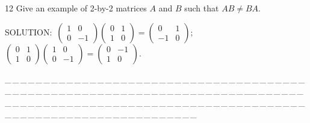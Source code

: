 \documentclass[a4paper, 11pt, UTF8]{article}
\begin{document}
\begin{large}
{\timesbf\Large 12} {\timessl\Large 
Give an example of 2-by-2 matrices $A$ and $B$ such that $AB\neq BA$.
}\par
{\timesbf S\footnotesize{OLUTION:}}\,\,\,$\begin{pmatrix} 1 & 0\\ 0 & -1\end{pmatrix}\begin{pmatrix}
0 & 1\\ 1 & 0\end{pmatrix}=\begin{pmatrix} 0 & 1\\ -1 & 0\end{pmatrix};$\qquad
$\begin{pmatrix} 0 & 1\\ 1 & 0\end{pmatrix}\begin{pmatrix}
1 & 0\\ 0 & -1\end{pmatrix}=\begin{pmatrix} 0 & -1\\ 1 & 0\end{pmatrix}.$\par
{\tiny \_\,\_\,\_\,\_\,\_\,\_\,\_\,\_\,\_\,\_\,\_\,\_\,\_\,\_\,\_\,\_\,\_\,\_\,\_\,\_\,\_\,\_\,\_\,\_\,\_\,\_\,\_\,\_\,\_\,\_\,\_\,\_\,\_\,\_\,\_\,\_\,\_\,\_\,\_\,\_\,\_\,\_\,\_\,\_\,\_\,\_\,\_\,\_\,\_\,\_\,\_\,\_\,\_\,\_\,\_\,\_\,\_\,\_\,\_\,\_\,\_\,\_\,\_\,\_\,\_\,\_\,\_\,\_\,\_\,\_\,\_\_\,\_\,\_\,\_\,\_\,\_\,\_\,\_\,\_\,\_\,\_\,\_\,\_\,\_\,\_\,\_\,\_\,\_\,\_\,\_\,\_\,\_\,\_\,\_\,\_\,\_\,\_\,\_\,\_\,\_\,\_\,\_\,\_\,\_\,\_\,\_\,\_\,\_\,\_\,\_\,\_\,\_\,\_\,\_\,\_\,\_\,\_\,\_\,\_\,\_\,\_\,\_\,\_\,\_\,\_\,\_\,\_\,\_\,\_\,\_\,\_\,\_\,\_\,\_\,\_\,\_\,\_\,\_\,\_\,\_\,\_}\par


\end{large}
\end{document}
